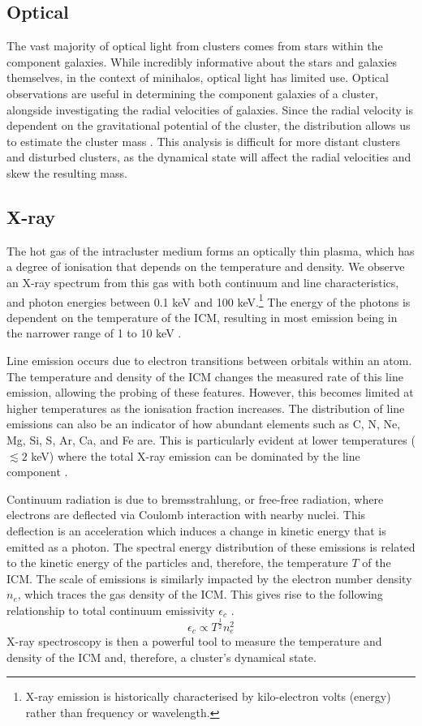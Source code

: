 \subsection{Optical}

The vast majority of optical light from clusters comes from stars within the component galaxies. While incredibly informative about the stars and galaxies themselves, in the context of minihalos, optical light has limited use. Optical observations are useful in determining the component galaxies of a cluster, alongside investigating the radial velocities of galaxies. Since the radial velocity is dependent on the gravitational potential of the cluster, the distribution allows us to estimate the cluster mass \citep{Voit2005}. This analysis is difficult for more distant clusters and disturbed clusters, as the dynamical state will affect the radial velocities and skew the resulting mass.

\subsection{X-ray}
The hot gas of the intracluster medium forms an optically thin plasma, which has a degree of ionisation that depends on the temperature and density. We observe an X-ray spectrum from this gas with both continuum and line characteristics, and photon energies between 0.1 keV and 100 keV.\footnote{X-ray emission is historically characterised by kilo-electron volts (energy) rather than frequency or wavelength.} The energy of the photons is dependent on the temperature of the ICM, resulting in most emission being in the narrower range of 1 to 10 keV \citep{Schneider2015}. 

Line emission occurs due to electron transitions between orbitals within an atom. The temperature and density of the ICM changes the measured rate of this line emission, allowing the probing of these features. However, this becomes limited at higher temperatures as the ionisation fraction increases. The distribution of line emissions can also be an indicator of how abundant elements such as C, N, Ne, Mg, Si, S, Ar, Ca, and Fe are. This is particularly evident at lower temperatures ($\lesssim 2$ keV) where the total X-ray emission can be dominated by the line component \citep{Voit2005, Schneider2015}.

Continuum radiation is due to bremsstrahlung, or free-free radiation, where electrons are deflected via Coulomb interaction with nearby nuclei. This deflection is an acceleration which induces a change in kinetic energy that is emitted as a photon. The spectral energy distribution of these emissions is related to the kinetic energy of the particles and, therefore, the temperature $T$ of the ICM. The scale of emissions is similarly impacted by the electron number density $n_e$, which traces the gas density of the ICM. This gives rise to the following relationship to total continuum emissivity $\epsilon_c$ \citep{Schneider2015}.
\begin{equation}
    \epsilon_{c} \propto T^\frac12 n_e^2
\end{equation}
X-ray spectroscopy is then a powerful tool to measure the temperature and density of the ICM and, therefore, a cluster's dynamical state. 

